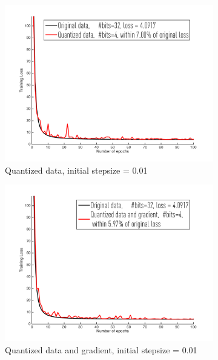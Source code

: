 \documentclass{article}
\begin{document}
\begin{figure}[h]
\centering
   
    \begin{subfigure}[h]{.3\columnwidth}
    \includegraphics[width=\columnwidth]{lr/synthetic/160hard/d001}
    \caption{Quantized data, initial stepsize = 0.01}
    \end{subfigure}
    \begin{subfigure}[h]{.3\columnwidth}
    \includegraphics[width=\columnwidth]{lr/synthetic/160hard/dg001}
    \caption{Quantized data and gradient, initial stepsize = 0.01}
    \end{subfigure}
    \begin{subfigure}[h]{.3\columnwidth}

\end{subfigure}
\end{figure}
\end{document}
